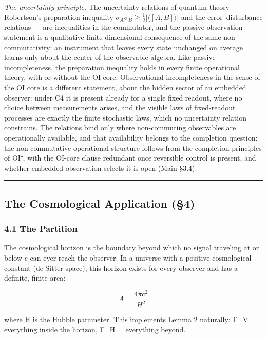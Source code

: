 \documentclass[
]{article}
\begin{document}
\emph{The uncertainty principle.} The uncertainty relations of quantum
theory --- Robertson's preparation inequality
\(\sigma_A\sigma_B \geq \tfrac{1}{2}|\langle[A,B]\rangle|\) and the
error--disturbance relations --- are inequalities in the commutator, and
the passive-observation statement is a qualitative finite-dimensional
consequence of the same non-commutativity: an instrument that leaves
every state unchanged on average learns only about the center of the
observable algebra. Like passive incompleteness, the preparation
inequality holds in every finite operational theory, with or without the
OI core. Observational incompleteness in the sense of the OI core is a
different statement, about the hidden sector of an embedded observer:
under C4 it is present already for a single fixed readout, where no
choice between measurements arises, and the visible laws of
fixed-readout processes are exactly the finite stochastic laws, which no
uncertainty relation constrains. The relations bind only where
non-commuting observables are operationally available, and that
availability belongs to the completion question: the non-commutative
operational structure follows from the completion principles of OI⁺,
with the OI-core clause redundant once reversible control is present,
and whether embedded observation selects it is open (Main §3.4).

\begin{center}\rule{0.5\linewidth}{0.5pt}\end{center}

\hypertarget{the-cosmological-application-4}{%
\subsection{The Cosmological Application
(§4)}\label{the-cosmological-application-4}}

\hypertarget{the-partition}{%
\subsubsection{4.1 The Partition}\label{the-partition}}

The cosmological horizon is the boundary beyond which no signal
traveling at or below c can ever reach the observer. In a universe with
a positive cosmological constant (de Sitter space), this horizon exists
for every observer and has a definite, finite area:

\[A = \frac{4\pi c^2}{H^2}\]

where H is the Hubble parameter. This implements Lemma 2 naturally: Γ\_V
= everything inside the horizon, Γ\_H = everything beyond.
\end{document}
